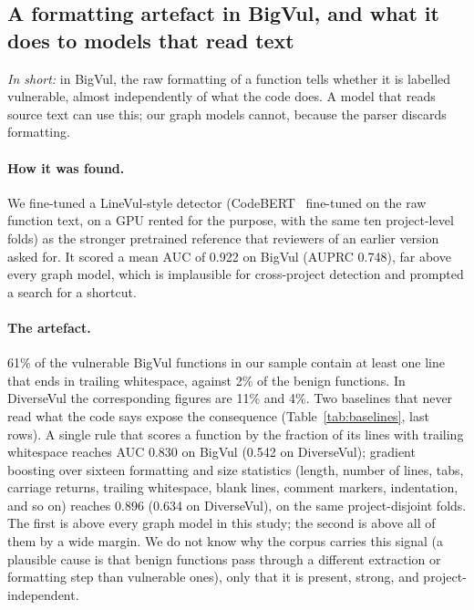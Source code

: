\documentclass[pdflatex,sn-basic]{sn-jnl}
\theoremstyle{thmstyleone}%
\newcommand{\numartBvTrailBenign}{2}
\newcommand{\numartBvTrailVuln}{61}
\newcommand{\numartDvTrailBenign}{4}
\newcommand{\numartDvTrailVuln}{11}
\newcommand{\rBvFormatAuc}{0.896}
\newcommand{\rBvLinevulAuc}{0.922}
\newcommand{\rBvLinevulAuprc}{0.748}
\newcommand{\rBvTrailAuc}{0.830}
\newcommand{\rDvFormatAuc}{0.634}
\newcommand{\rDvTrailAuc}{0.542}
\begin{document}
\subsection{A formatting artefact in BigVul, and what it does to models that read text}
\label{sec:artefact}

\emph{In short:} in BigVul, the raw formatting of a function tells whether it is
labelled vulnerable, almost independently of what the code does. A model that
reads source text can use this; our graph models cannot, because the parser
discards formatting.

\paragraph{How it was found.} We fine-tuned a LineVul-style detector
(CodeBERT~\citep{fu2022linevul} fine-tuned on the raw function text, on a GPU
rented for the purpose, with the same ten project-level folds) as the stronger
pretrained reference that reviewers of an earlier version asked for. It scored
a mean AUC of \rBvLinevulAuc{} on BigVul (AUPRC \rBvLinevulAuprc{}), far above
every graph model, which is implausible for cross-project detection and
prompted a search for a shortcut.

\paragraph{The artefact.} \numartBvTrailVuln\% of the vulnerable BigVul functions
in our sample contain at least one line that ends in trailing whitespace,
against \numartBvTrailBenign\% of the benign functions. In DiverseVul the
corresponding figures are \numartDvTrailVuln\% and \numartDvTrailBenign\%.
Two baselines that never read what the code says expose the consequence
(Table~\ref{tab:baselines}, last rows). A single rule that scores a function by
the fraction of its lines with trailing whitespace reaches AUC \rBvTrailAuc{}
on BigVul (\rDvTrailAuc{} on DiverseVul); gradient boosting over sixteen
formatting and size statistics (length, number of lines, tabs, carriage
returns, trailing whitespace, blank lines, comment markers, indentation, and so
on) reaches \rBvFormatAuc{} (\rDvFormatAuc{} on DiverseVul), on the same
project-disjoint folds. The first is above every graph model in this study; the
second is above all of them by a wide margin. We do not know why the corpus
carries this signal (a plausible cause is that benign functions pass through a
different extraction or formatting step than vulnerable ones), only that it is
present, strong, and project-independent.
\end{document}
